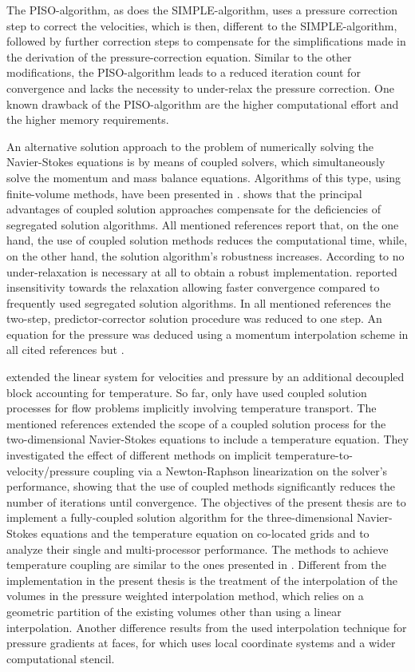 The PISO-algorithm, as does the SIMPLE-algorithm, uses a pressure correction step to correct the velocities, which is then, different to the SIMPLE-algorithm, followed by further correction steps to compensate for the simplifications made in the derivation of the pressure-correction equation. Similar to the other modifications, the PISO-algorithm leads to a reduced iteration count for convergence and lacks the necessity to under-relax the pressure correction. One known drawback of the PISO-algorithm are the higher computational effort and the higher memory requirements.

An alternative solution approach to the problem of numerically solving the Navier-Stokes equations is by means of coupled solvers, which simultaneously solve the momentum and mass balance equations. Algorithms of this type, using finite-volume methods, have been presented in \cite{chen10,darwish09,falk13,galpin86,klaij13,mangani14,vakilipour12}. \cite{darwish09} shows that the principal advantages of coupled solution approaches compensate for the deficiencies of segregated solution algorithms. All mentioned references report that, on the one hand, the use of coupled solution methods reduces the computational time, while, on the other hand, the solution algorithm's robustness increases. According to \cite{darwish09} no under-relaxation is necessary at all to obtain a robust implementation. \cite{galpin86} reported insensitivity towards the relaxation allowing faster convergence compared to frequently used segregated solution algorithms. In all mentioned references the two-step, predictor-corrector solution procedure was reduced to one step. An equation for the pressure was deduced using a momentum interpolation scheme \cite{rhie82} in all cited references but \cite{galpin86}.

\cite{chen10} extended the linear system for velocities and pressure by an additional decoupled block accounting for temperature. So far, only \cite{galpin86,vakilipour12} have used coupled solution processes for flow problems implicitly involving temperature transport. The mentioned references extended the scope of a coupled solution process for the two-dimensional Navier-Stokes equations to include a temperature equation. They investigated the effect of different methods on implicit temperature-to-velocity/pressure coupling via a Newton-Raphson linearization on the solver's performance, showing that the use of coupled methods significantly reduces the number of iterations until convergence. The objectives of the present thesis are to implement a fully-coupled solution algorithm for the three-dimensional Navier-Stokes equations and the temperature equation on co-located grids and to analyze their single and multi-processor performance. The methods to achieve temperature coupling are similar to the ones presented in \cite{vakilipour12}. Different from the implementation in the present thesis is the treatment of the interpolation of the volumes in the pressure weighted interpolation method, which relies on a geometric partition of the existing volumes other than using a linear interpolation. Another difference results from the used interpolation technique for pressure gradients at faces, for which \cite{vakilipour12} uses local coordinate systems and a wider computational stencil.

